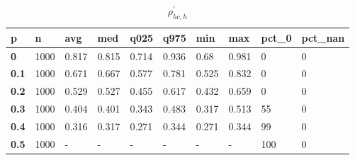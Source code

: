 \begin{table}[h]
 \centering 
\footnotesize
\caption{$\rho_{hc,h}^\prime $}
\label{tab:alphahch}
\begin{tabular}[h]{|l|l|l|l|l|l|l|l|l|l|
    } \hline
\textbf{ p} & \textbf{ n} & \textbf{ avg} & \textbf{ med} & \textbf{ q025} & \textbf{ q975} & \textbf{ min} & \textbf{ max} & \textbf{ pct\_0} & \textbf{ pct\_nan}
    \\ \hline
  \textbf{  0} & 1000 & 0.817 & 0.815 & 0.714 & 0.936 &  0.68 & 0.981 &   0 & 0
    \\ \hline
  \textbf{0.1} & 1000 & 0.671 & 0.667 & 0.577 & 0.781 & 0.525 & 0.832 &   0 & 0
    \\ \hline
  \textbf{0.2} & 1000 & 0.529 & 0.527 & 0.455 & 0.617 & 0.432 & 0.659 &   0 & 0
    \\ \hline
  \textbf{0.3} & 1000 & 0.404 & 0.401 & 0.343 & 0.483 & 0.317 & 0.513 &  55 & 0
    \\ \hline
  \textbf{0.4} & 1000 & 0.316 & 0.317 & 0.271 & 0.344 & 0.271 & 0.344 &  99 & 0
    \\ \hline
  \textbf{0.5} & 1000 & - & - & - & - & - & - & 100 & 0
    \\ \hline
 \end{tabular}
 \end{table}

